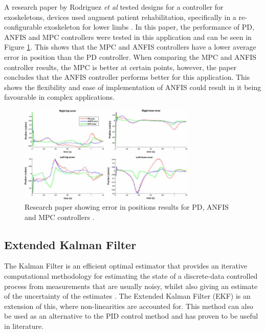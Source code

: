 A research paper by Rodriguez \textit{et al} tested designs for a controller for exoskeletons, devices used augment patient rehabilitation, specifically in a re-configurable exoskeleton for lower limbs \cite{zain11}. In this paper, the performance of PD, ANFIS and MPC controllers were tested in this application and can be seen in Figure \ref{fig:mpc}. This shows that the MPC and ANFIS controllers have a lower average error in position than the PD controller. When comparing the MPC and ANFIS controller results, the MPC is better at certain points, however, the paper concludes that the ANFIS controller performs better for this application. This shows the flexibility and ease of implementation of ANFIS could result in it being favourable in complex applications.  
\begin{figure}[H]
    \centering
    \includegraphics[width = 0.75\textwidth]{img/mpc_results.jpg}
    \caption[Research paper showing error in positions results for PD, ANFIS and MPC controllers]{Research paper showing error in positions results for PD, ANFIS and MPC controllers \cite{zain11}.} 
    \label{fig:mpc}
\end{figure} 
\subsection{Extended Kalman Filter}
The Kalman Filter is an efficient optimal estimator that provides an iterative computational methodology for estimating the state of a discrete-data controlled process from measurements that are usually noisy, whilst also giving an estimate of the uncertainty of the estimates \cite{zain12}. The Extended Kalman Filter (EKF) is an extension of this, where non-linearities are accounted for. This method can also be used as an alternative to the PID control method and has proven to be useful in literature. 


